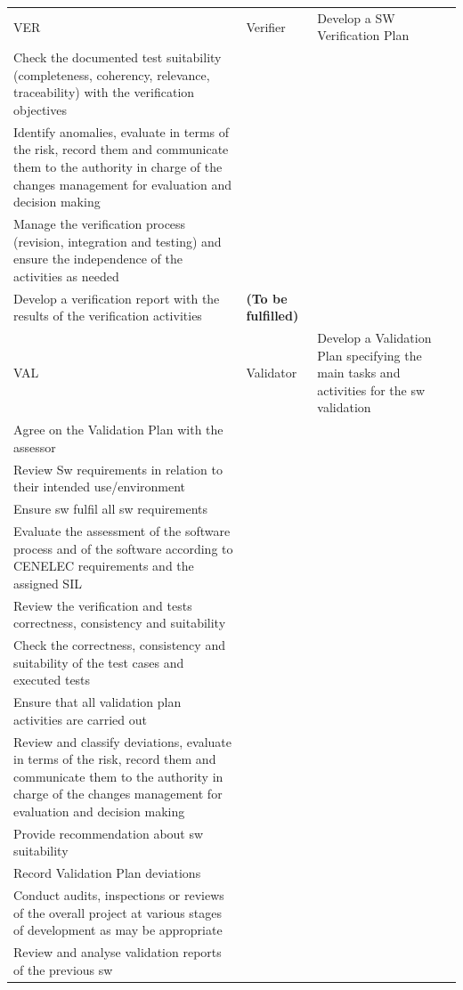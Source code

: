 \documentclass{template/openetcs_article}
\begin{document}
\begin{landscape}
\begin{flushleft}
\begin{supertabular}[H]{|m{1cm}|m{2,5cm}|m{15,5cm}|m{6cm}|}
\\\hline
VER &
Verifier &
\raggedright
Develop a SW Verification Plan \citep{verification}\\
Check the documented test suitability (completeness, coherency, relevance, traceability) with the verification objectives\\
Identify anomalies, evaluate in terms of the risk, record them and communicate them to the authority in charge of the changes management for evaluation and decision making\\
Manage the verification process (revision, integration and testing) and ensure the independence of the activities as needed\\
Develop a verification report with the results of the verification activities &
\textbf{(To be fulfilled)}
\\\hline
VAL &
Validator &
\raggedright
Develop a Validation Plan specifying the main tasks and activities for the sw validation\\
Agree on the Validation Plan with the assessor\\
Review Sw requirements in relation to their intended use/environment\\
Ensure sw fulfil all sw requirements\\
Evaluate the assessment of the software process and of the software according to CENELEC requirements and the assigned SIL\\
Review the verification and tests correctness, consistency and suitability \\
Check the correctness, consistency and suitability of the test cases and executed tests\\
Ensure that all validation plan activities are carried out\\
Review and classify deviations, evaluate in terms of the risk, record them and communicate them to the authority in charge of the changes management for evaluation and decision making\\ 
Provide recommendation about sw suitability\\
Record Validation Plan deviations\\
Conduct audits, inspections or reviews of the overall project at various stages of development as may be appropriate\\
Review and analyse validation reports of the previous sw\\

\end{supertabular}
\end{flushleft}
\end{landscape}
\end{document}
